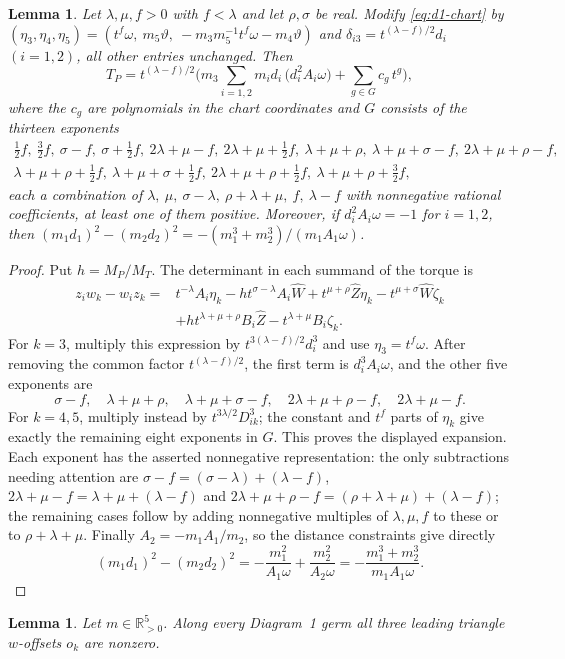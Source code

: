 \documentclass[Threeside,11pt]{article}
\newtheorem{lemma}[theorem]{Lemma}
\theoremstyle{definition}
\theoremstyle{remark}
\numberwithin{equation}{section}
\theoremstyle{remark}
\newcommand{\Rp}{\mathbb{R}_{>0}}
\begin{document}
{\begin{lemma}\label{lem:d1-torque}
Let $\lambda,\mu,f>0$ with $f<\lambda$ and let $\rho,\sigma$ be real.  Modify
\eqref{eq:d1-chart} by $(\eta_3,\eta_4,\eta_5)=(t^f\omega,\ m_5\vartheta,\
-m_3m_5^{-1}t^f\omega-m_4\vartheta)$ and $\delta_{i3}=t^{(\lambda-f)/2}d_i$ $(i=1,2)$, all other
entries unchanged.  Then
\[
  T_P=t^{(\lambda-f)/2}\Big(m_3\sum_{i=1,2}m_id_i\,\big(d_i^2A_i\omega\big)+\sum_{g\in G}c_g\,t^g\Big),
\]
where the $c_g$ are polynomials in the chart coordinates and $G$ consists of the thirteen
exponents
\[
\begin{gathered}
  \tfrac12f,\ \tfrac32f,\ \sigma-f,\ \sigma+\tfrac12f,\ 2\lambda+\mu-f,\
  2\lambda+\mu+\tfrac12f,\ \lambda+\mu+\rho,\ \lambda+\mu+\sigma-f,\ 2\lambda+\mu+\rho-f,\\
  \lambda+\mu+\rho+\tfrac12f,\ \lambda+\mu+\sigma+\tfrac12f,\ 2\lambda+\mu+\rho+\tfrac12f,\
  \lambda+\mu+\rho+\tfrac32f,
\end{gathered}
\]
each a combination of $\lambda,\ \mu,\ \sigma-\lambda,\ \rho+\lambda+\mu,\ f,\ \lambda-f$ with
nonnegative rational coefficients, at least one of them positive.  Moreover, if
$d_i^2A_i\omega=-1$ for $i=1,2$, then $(m_1d_1)^2-(m_2d_2)^2=-(m_1^3+m_2^3)/(m_1A_1\omega)$.
\end{lemma}}
{\begin{proof}
Put $h=M_P/M_T$.  The determinant in each summand of the torque is
\begin{align*}
 z_iw_k-w_iz_k
 ={}&t^{-\lambda}A_i\eta_k-h t^{\sigma-\lambda}A_i\hat W
       +t^{\mu+\rho}\hat Z\eta_k-t^{\mu+\sigma}\hat W\zeta_k\\
   &+h t^{\lambda+\mu+\rho}B_i\hat Z
       -t^{\lambda+\mu}B_i\zeta_k.
\end{align*}
For $k=3$, multiply this expression by
$t^{3(\lambda-f)/2}d_i^3$ and use $\eta_3=t^f\omega$.
After removing the common factor $t^{(\lambda-f)/2}$, the first term
is $d_i^3A_i\omega$, and the other five exponents are
\[
 \sigma-f,\quad\lambda+\mu+\rho,\quad
 \lambda+\mu+\sigma-f,\quad2\lambda+\mu+\rho-f,\quad2\lambda+\mu-f.
\]
For $k=4,5$, multiply instead by $t^{3\lambda/2}D_{ik}^3$;
the constant and $t^f$ parts of $\eta_k$ give exactly the remaining
eight exponents in $G$.  This proves the displayed expansion.
Each exponent has the asserted nonnegative representation: the only
subtractions needing attention are
$\sigma-f=(\sigma-\lambda)+(\lambda-f)$,
$2\lambda+\mu-f=\lambda+\mu+(\lambda-f)$ and
$2\lambda+\mu+\rho-f=(\rho+\lambda+\mu)+(\lambda-f)$;
the remaining cases follow by adding nonnegative multiples of
$\lambda,\mu,f$ to these or to $\rho+\lambda+\mu$.
Finally $A_2=-m_1A_1/m_2$, so the distance constraints give directly
\[
 (m_1d_1)^2-(m_2d_2)^2
 =-\frac{m_1^2}{A_1\omega}+\frac{m_2^2}{A_2\omega}
 =-\frac{m_1^3+m_2^3}{m_1A_1\omega}.
\]
\end{proof}

}\begin{lemma}\label{lem:d1-central}
Let $m\in\Rp^5$.  Along every Diagram~1 germ all three leading triangle $w$-offsets $o_k$ are
nonzero.
\end{lemma}
\end{document}
